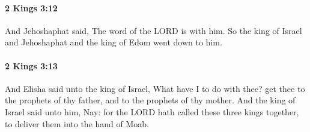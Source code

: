 		\paragraph{2 Kings 3:12} %
			\label{2KINGS-3-12}

			And Jehoshaphat said, The word of the LORD is with him. So the king of Israel and Jehoshaphat and the king of Edom went down to him.


		\paragraph{2 Kings 3:13} %
			\label{2KINGS-3-13}

			And Elisha said unto the king of Israel, What have I to do with thee? get thee to the prophets of thy father, and to the prophets of thy mother. And the king of Israel said unto him, Nay: for the LORD hath called these three kings together, to deliver them into the hand of Moab.

